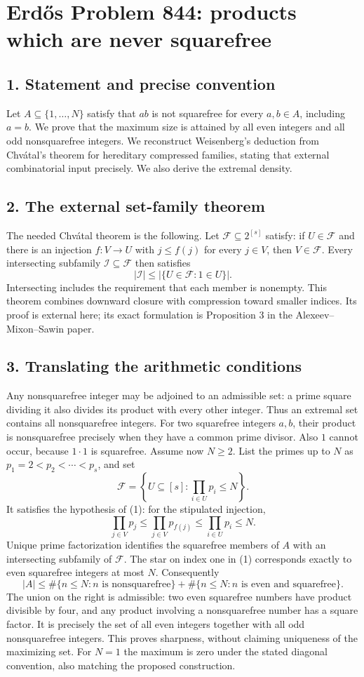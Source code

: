 \section*{Erd\H{o}s Problem 844: products which are never squarefree}
\subsection*{1. Statement and precise convention}
Let $A\subseteq\{1,\ldots,N\}$ satisfy that $ab$ is not squarefree for every $a,b\in A$, including $a=b$. We prove that the maximum size is attained by all even integers and all odd nonsquarefree integers. We reconstruct Weisenberg's deduction from Chv\'atal's theorem for hereditary compressed families, stating that external combinatorial input precisely. We also derive the extremal density.
\subsection*{2. The external set-family theorem}
The needed Chv\'atal theorem is the following. Let $\mathcal F\subseteq2^{[s]}$ satisfy: if $U\in\mathcal F$ and there is an injection $f:V\to U$ with $j\le f(j)$ for every $j\in V$, then $V\in\mathcal F$. Every intersecting subfamily $\mathcal I\subseteq\mathcal F$ then satisfies
\[
 |\mathcal I|\le|\{U\in\mathcal F:1\in U\}|.             \tag{1}
\]
Intersecting includes the requirement that each member is nonempty. This theorem combines downward closure with compression toward smaller indices. Its proof is external here; its exact formulation is Proposition 3 in the Alexeev--Mixon--Sawin paper.
\subsection*{3. Translating the arithmetic conditions}
Any nonsquarefree integer may be adjoined to an admissible set: a prime square dividing it also divides its product with every other integer. Thus an extremal set contains all nonsquarefree integers. For two squarefree integers $a,b$, their product is nonsquarefree precisely when they have a common prime divisor. Also $1$ cannot occur, because $1\cdot1$ is squarefree.
Assume now $N\ge2$. List the primes up to $N$ as $p_1=2<p_2<\cdots<p_s$, and set
\[
 \mathcal F=\left\{U\subseteq[s]:\prod_{i\in U}p_i\le N\right\}.
\]
It satisfies the hypothesis of (1): for the stipulated injection,
\[
 \prod_{j\in V}p_j\le\prod_{j\in V}p_{f(j)}\le\prod_{i\in U}p_i\le N.
\]
Unique prime factorization identifies the squarefree members of $A$ with an intersecting subfamily of $\mathcal F$. The star on index one in (1) corresponds exactly to even squarefree integers at most $N$. Consequently
\[
 |A|\le\#\{n\le N:n\text{ is nonsquarefree}\}
       +\#\{n\le N:n\text{ is even and squarefree}\}.    \tag{2}
\]
The union on the right is admissible: two even squarefree numbers have product divisible by four, and any product involving a nonsquarefree number has a square factor. It is precisely the set of all even integers together with all odd nonsquarefree integers. This proves sharpness, without claiming uniqueness of the maximizing set. For $N=1$ the maximum is zero under the stated diagonal convention, also matching the proposed construction.
